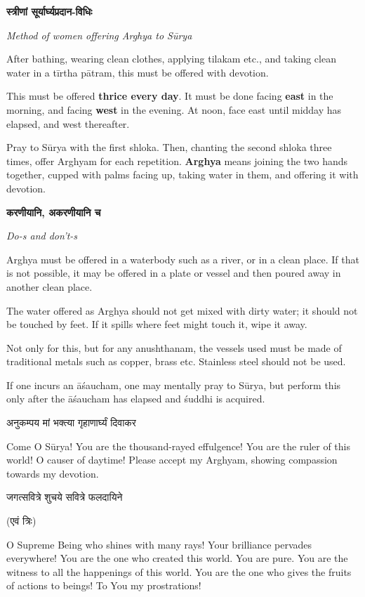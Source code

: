 
\centerline{\bfseries स्त्रीणां सूर्यार्घ्यप्रदान-विधिः}
\centerline{\sffamily \emph{Method of women offering Arghya to Sūrya}}

{\sffamily After bathing, wearing clean clothes, applying tilakam etc., and taking clean water in a tīrtha pātram, this must be offered with devotion.}

\faClockO{} {\sffamily This must be offered \textbf{thrice every day}. It must be done facing \textbf{east} in the morning, and facing \textbf{west} in the evening. At noon, face east until midday has elapsed, and west thereafter.}

{\sffamily Pray to Sūrya with the first shloka. Then, chanting the second shloka three times, offer Arghyam for each repetition. \textbf{Arghya} means joining the two hands together, cupped with palms facing up, taking water in them, and offering it with devotion.}

\centerline{\bfseries करणीयानि, अकरणीयानि च}
\centerline{\sffamily \emph{Do-s and don't-s}}

{\sffamily Arghya must be offered in a waterbody such as a river, or in a clean place. If that is not possible, it may be offered in a plate or vessel and then poured away in another clean place.

The water offered as Arghya should not get mixed with dirty water; it should not be touched by feet. If it spills where feet might touch it, wipe it away.

Not only for this, but for any anushthanam, the vessels used must be made of traditional metals such as copper, brass etc. Stainless steel should not be used.

If one incurs an āśaucham, one may mentally pray to Sūrya, but perform this only after the āśaucham has elapsed and śuddhi is acquired.}


{अनुकम्पय मां भक्त्या गृहाणार्घ्यं दिवाकर}

{\sffamily Come O Sūrya! You are the thousand-rayed effulgence! You are the ruler of this world! O causer of daytime! Please accept my Arghyam, showing compassion towards my devotion.}


{जगत्सवित्रे शुचये सवित्रे फलदायिने}
\centerline{(एवं त्रिः)}

{\sffamily O Supreme Being who shines with many rays! Your brilliance pervades everywhere! You are the one who created this world. You are pure. You are the witness to all the happenings of this world. You are the one who gives the fruits of actions to beings! To You my prostrations!}

\closesection
